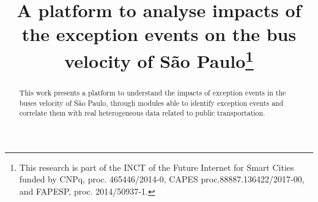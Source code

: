 \documentclass[runningheads]{llncs}
\begin{document}
%
\title{A platform to analyse impacts of the exception events on the bus velocity of São Paulo\thanks{This research is part of the INCT of the Future Internet for Smart Cities funded by CNPq, proc. 465446/2014-0, CAPES proc.88887.136422/2017-00, and FAPESP, proc. 2014/50937-1.}}
%
%

%
%
%
\maketitle              %
%
\begin{abstract}

This work presents a platform to understand the impacts of exception events in the buses velocity of São Paulo, through modules able to identify exception events and correlate them with real heterogeneous data related to public transportation.


\end{abstract}
%
%
%
%
%
\end{document}
